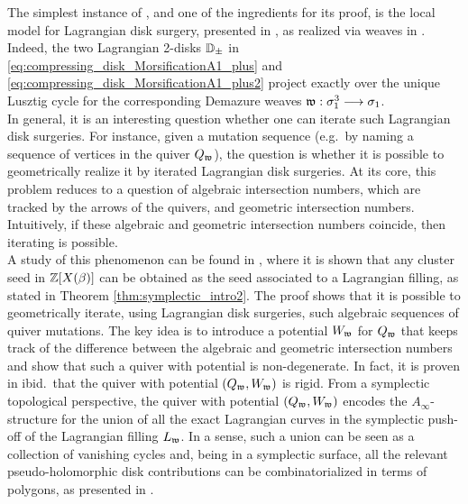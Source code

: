 \noindent The simplest instance of , and one of the ingredients for its proof, is the local model for Lagrangian disk surgery, presented in , as realized via weaves in . Indeed, the two Lagrangian 2-disks $\mathbb{D}_\pm$ in \eqref{eq:compressing_disk_MorsificationA1_plus} and \eqref{eq:compressing_disk_MorsificationA1_plus2} project exactly over the unique Lusztig cycle for the corresponding Demazure weaves $\mathfrak{w}:\sigma_1^3\longrightarrow\sigma_1$.\sbs \\

In general, it is an interesting question whether one can iterate such Lagrangian disk surgeries. For instance, given a mutation sequence (e.g.~by naming a sequence of vertices in the quiver $Q_{\mathfrak{w}}$), the question is whether it is possible to geometrically realize it by iterated Lagrangian disk surgeries. At its core, this problem reduces to a question of algebraic intersection numbers, which are tracked by the arrows of the quivers, and geometric intersection numbers. Intuitively, if these algebraic and geometric intersection numbers coincide, then iterating is possible.\\

A study of this phenomenon can be found in \cite{CasalsGao24}, where it is shown that any cluster seed in $\mathbb{Z}[X(\beta)]$ can be obtained as the seed associated to a Lagrangian filling, as stated in Theorem \ref{thm:symplectic_intro2}. The proof shows that it is possible to geometrically iterate, using Lagrangian disk surgeries, such algebraic sequences of quiver mutations. The key idea is to introduce a potential $W_{\mathfrak{w}}$ for $Q_{\mathfrak{w}}$ that keeps track of the difference between the algebraic and geometric intersection numbers and show that such a quiver with potential is non-degenerate. In fact, it is proven in ibid.~that the quiver with potential $(Q_{\mathfrak{w}},W_{\mathfrak{w}})$ is rigid. From a symplectic topological perspective, the quiver with potential $(Q_{\mathfrak{w}},W_{\mathfrak{w}})$ encodes the $A_\infty$-structure for the union of all the exact Lagrangian curves in the symplectic push-off of the Lagrangian filling $L_{\mathfrak{w}}$. In a sense, such a union can be seen as a collection of vanishing cycles and, being in a symplectic surface, all the relevant pseudo-holomorphic disk contributions can be combinatorialized in terms of polygons, as presented in \cite[Section 2]{CasalsGao24}.



